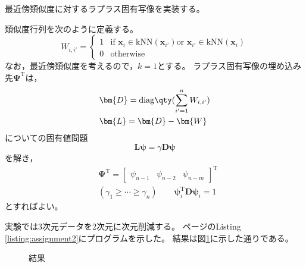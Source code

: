 \documentclass[class=jsarticle, crop=false, dvipdfmx, fleqn]{standalone}
\begin{document}
\section{}

最近傍類似度に対するラプラス固有写像を実装する。

類似度行列を次のように定義する。
\begin{equation}
    W_{i, i'} =
        \begin{cases}
            1 & \text{if } \bm{x}_i \in \mathrm{kNN}(\bm{x}_{i'}) \text{or } \bm{x}_{i'} \in \mathrm{kNN}(\bm{x}_i) \\
            0 & \text{otherwise}
        \end{cases}
\end{equation}
なお，最近傍類似度を考えるので，\(k = 1\)とする。
ラプラス固有写像の埋め込み先\(\bm{\Psi}^\mathrm{T}\)は，
\begin{align}
    & \bm{D} = \mathrm{diag}\qty(\sum_{i'=1}^{n} W_{i, i'}) \\
    & \bm{L} = \bm{D} - \bm{W}
\end{align}
についての固有値問題
\begin{equation}
    \bm{L} \bm{\psi} = \gamma \bm{D} \bm{\psi}
\end{equation}
を解き，
\begin{align}
    & \bm{\Psi}^\mathrm{T} =
        \begin{bmatrix}
            \psi_{n-1} & \psi_{n-2} & \psi_{n-m}
        \end{bmatrix}^\mathrm{T} \\
    & (\gamma_1 \ge \cdots \ge \gamma_n) \qquad \bm{\psi}_i^\mathrm{T} \bm{D} \bm{\psi}_i = 1
\end{align}
とすればよい。

実験では3次元データを2次元に次元削減する。
\pageref{listing:assignment2}ページのListing \ref{listing:assignment2}にプログラムを示した。
結果は図\ref{fig:result}に示した通りである。


\begin{figure}[H]
    \centering
    \caption{結果}
    \label{fig:result}
\end{figure}
\end{document}

